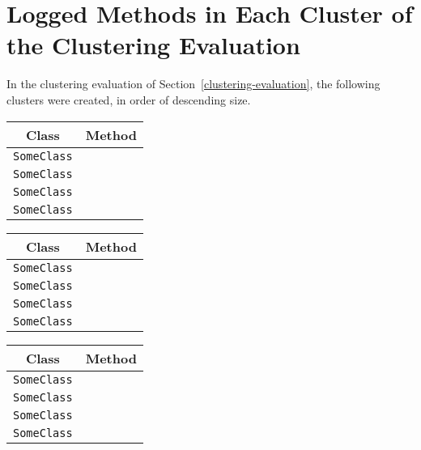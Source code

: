 
\chapter{Logged Methods in Each Cluster of the Clustering Evaluation}\label{append}

In the clustering evaluation of Section~\ref{clustering-evaluation}, the following clusters were created, in order of descending size.

\begin{center}
\begin{tabular}{ll}\toprule
\multicolumn{1}{c}{Class}&\multicolumn{1}{c}{Method}\\\midrule
\lstinline/SomeClass/&\raisebox{0pt}{\lstinline/foo(int)/}\\
\lstinline/SomeClass/&\raisebox{0pt}{\lstinline/foo(int)/}\\
\lstinline/SomeClass/&\raisebox{0pt}{\lstinline/foo(int)/}\\
\lstinline/SomeClass/&\raisebox{0pt}{\lstinline/foo(int)/}\\
\bottomrule
\end{tabular}
\end{center}

\begin{center}
\begin{tabular}{ll}\toprule
\multicolumn{1}{c}{Class}&\multicolumn{1}{c}{Method}\\\midrule
\lstinline/SomeClass/&\raisebox{0pt}{\lstinline/foo(int)/}\\
\lstinline/SomeClass/&\raisebox{0pt}{\lstinline/foo(int)/}\\
\lstinline/SomeClass/&\raisebox{0pt}{\lstinline/foo(int)/}\\
\lstinline/SomeClass/&\raisebox{0pt}{\lstinline/foo(int)/}\\
\bottomrule
\end{tabular}
\end{center}

\begin{center}
\begin{tabular}{ll}\toprule
\multicolumn{1}{c}{Class}&\multicolumn{1}{c}{Method}\\\midrule
\lstinline/SomeClass/&\raisebox{0pt}{\lstinline/foo(int)/}\\
\lstinline/SomeClass/&\raisebox{0pt}{\lstinline/foo(int)/}\\
\lstinline/SomeClass/&\raisebox{0pt}{\lstinline/foo(int)/}\\
\lstinline/SomeClass/&\raisebox{0pt}{\lstinline/foo(int)/}\\
\bottomrule
\end{tabular}
\end{center}
